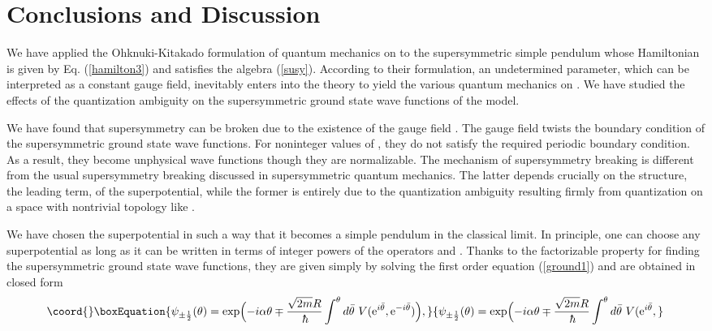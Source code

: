 \documentclass[a4paper,12pt]{article}
\begin{document}
{\section{Conclusions and Discussion}
We have applied the Ohknuki-Kitakado formulation of quantum 
mechanics on \coordHE{} to the supersymmetric 
simple pendulum whose Hamiltonian is given by Eq. (\ref{hamilton3}) and 
satisfies the algebra (\ref{susy}). 
According to their formulation, an undetermined parameter, which can be 
interpreted as a constant gauge field, inevitably
enters into the theory to yield the various quantum mechanics on \coordHE{}.  
We have studied the effects of the quantization ambiguity on the 
supersymmetric ground state wave functions of the model.
\par
We have found that supersymmetry can be broken due to the 
existence of the gauge field \myHighlight{$\alpha$}\coordHE{}. The gauge field twists 
the boundary condition
of the supersymmetric ground state wave functions. 
For noninteger values of \myHighlight{$\alpha$}\coordHE{}, they 
do not satisfy the required periodic boundary condition.
As a result, they become unphysical wave functions though they are 
normalizable. The mechanism of supersymmetry breaking 
is different from the usual supersymmetry breaking
discussed in supersymmetric quantum mechanics. 
The latter depends crucially on the structure, the leading term, of 
the superpotential, while the former is entirely due to the quantization 
ambiguity resulting firmly from 
quantization on a space with nontrivial topology like \coordHE{}. 
\par
We have chosen the superpotential \coordHE{}
in such a way that it becomes a simple pendulum in the classical limit.
In principle, one can choose any superpotential as long as it can be written 
in terms of integer powers of the operators \myHighlight{$\hw$}\coordHE{} and \myHighlight{$\hwd$}\coordHE{}. 
Thanks to the factorizable property for finding  
the supersymmetric ground state wave functions,
they are given simply by solving the first order equation (\ref{ground1})
and are obtained in closed form
\begin{equation}\coord{}\boxEquation{
\psi_{\pm \half}({\theta})={\rm exp}\Bigl(-i\alpha\theta \mp 
{{\sqrt{2m}R}\over\hbar}\int^{\theta}d{\bar\theta}~V(\e^{i{\bar\theta}},
\e^{-i{\bar\theta}}) \Bigr),
\label{closed}
}{
\psi_{\pm \half}({\theta})={\rm exp}\Bigl(-i\alpha\theta \mp 
{{\sqrt{2m}R}\over\hbar}\int^{\theta}d{\bar\theta}~V(\e^{i{\bar\theta}},
}
\end{equation}}
\end{document}

